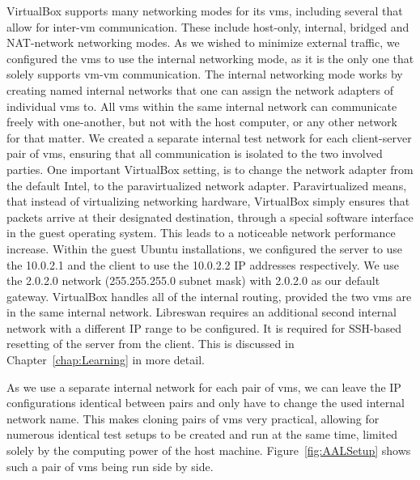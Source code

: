 VirtualBox supports many networking modes for its \acp{vm}, including several that allow for inter-\ac{vm} communication. These include host-only, internal, bridged and NAT-network networking modes.
As we wished to minimize external traffic, we configured the \acp{vm} to use the internal networking mode, as it is the only one that solely supports \ac{vm}-\ac{vm} communication.
The internal networking mode works by creating named internal networks that one can assign the network adapters of individual \acp{vm} to. All \acp{vm} within the same internal network can communicate freely with one-another, but not with the host computer, or any other network for that matter. We created a separate internal test network for each client-server pair of \acp{vm}, ensuring that all communication is isolated to the two involved parties. One important VirtualBox setting, is to change the network adapter from the default Intel, to the paravirtualized network adapter. Paravirtualized means, that instead of virtualizing networking hardware, VirtualBox simply ensures that packets arrive at their designated destination, through a special software interface in the guest operating system. This leads to a noticeable network performance increase. Within the guest Ubuntu installations, we configured the server to use the 10.0.2.1 and the client to use the 10.0.2.2 IP addresses respectively. We use the 2.0.2.0 network (255.255.255.0 subnet mask) with 2.0.2.0 as our default gateway. VirtualBox handles all of the internal routing, provided the two \acp{vm} are in the same internal network. Libreswan requires an additional second internal network with a different IP range to be configured. It is required for SSH-based resetting of the server from the client. This is discussed in Chapter~\ref{chap:Learning} in more detail.

As we use a separate internal network for each pair of \acp{vm}, we can leave the IP configurations identical between pairs and only have to change the used internal network name. This makes cloning pairs of \acp{vm} very practical, allowing for numerous identical test setups to be created and run at the same time, limited solely by the computing power of the host machine. Figure~\ref{fig:AALSetup} shows such a pair of \acp{vm} being run side by side.

